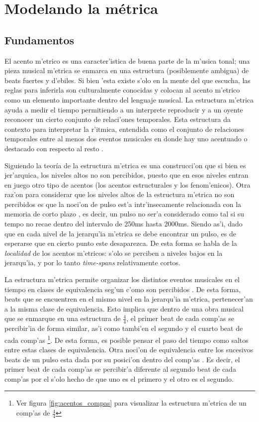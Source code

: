 \section{Modelando la m\'etrica}
\label{sec:metric_model}
\subsection{Fundamentos}
\label{sec:metric_fundamentos}
El acento m'etrico es una caracter'istica de buena parte de la m'usica tonal; una pieza musical m'etrica se enmarca en una estructura 
(posiblemente ambigua) de beats fuertes y d'ebiles. Si bien 'esta existe s'olo en la mente del que escucha, las reglas para inferirla son culturalmente conocidas 
y colocan al acento m'etrico como un elemento importante dentro del lenguaje musical. La estructura m'etrica ayuda a medir el tiempo permitiendo a un interprete 
reproducir y a un oyente reconocer un cierto conjunto de relaci'ones temporales. Esta estructura da contexto para interpretar la r'itmica,  
entendida como el conjunto de relaciones temporales entre al menos dos eventos musicales en donde hay uno acentuado o destacado con respecto al resto \citep{CooperMeyer60}.


Siguiendo la teor\'ia de \cite{LerdahlJackendoff83} la estructura m'etrica es una construcci'on que si bien es jer'arquica, los niveles altos no son percibidos, puesto
que en esos niveles entran en juego otro tipo de acentos (los acentos estructurales y los fenom'enicos). 
Otra raz'on para considerar que los niveles altos de la estructura m'etrica no son percibidos es que la noci'on de pulso est'a intr'insecamente relacionada 
con la memoria de corto plazo \citep[p. 167]{snyder2001}, es decir, un pulso no ser'a considerado como tal si su tempo no recae dentro del intervalo de 250ms hasta 
2000ms. Siendo as'i, dado que en cada nivel de la jerarqu'ia m'etrica se debe encontrar un pulso, es de esperarse que en cierto punto este desaparezca.
De esta forma se habla de la \emph{localidad} de los acentos m'etricos: 
s'olo se perciben a niveles bajos en la jerarqu'ia, y por lo tanto \emph{time-spans} relativamente cortos. 

La estructura m'etrica permite organizar los distintos eventos musicales en el tiempo en clases de equivalencia seg'un c'omo son percibidos \citep{Benjamin84}.
De esta forma, beats que se encuentren en el mismo nivel en la jerarqu'ia m'etrica, pertenecer'an a la misma clase de equivalencia.
Esto implica que dentro de una obra musical que se enmarque en una estructura de $\frac{4}{4}$, el primer beat de cada comp'as se percibir'ia de forma similar, 
as'i como tambi'en el segundo y el cuarto beat de cada comp'as \footnote{Ver figura \ref{fig:acentos_compas} para visualizar la estructura m'etrica de un comp'as de 
$\frac{4}{4}$}.
De esta forma, es posible pensar el paso del tiempo como saltos entre estas clases de equivalencia. 
Otra noci'on de equivalencia entre los sucesivos beats de un pulso esta dada por su posici'on dentro del comp'as \citep{clarke1987categorical}. Es decir, el primer beat
de cada comp'as se percibir'a diferente al segundo beat de cada comp'as por el s'olo hecho de que uno es el primero y el otro es el segundo.

